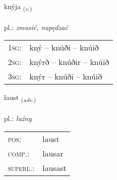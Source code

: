\documentclass[frontgrid, backgrid]{flacards}\usepackage[]{graphicx}\usepackage[]{xcolor}
\begin{document}
\renewcommand{\flhead}{\vskip5pt \fboxsep=0pt {\small\bfseries\footnotesize Sagnorð | czasownik}}
\renewcommand{\fcfoot}{\vskip5pt \fboxsep=0pt \hspace{2pt}{\small\bfseries\footnotesize 3K}}

\renewcommand{\blhead}{\vskip5pt {\small\bfseries\footnotesize Sagnorð | czasownik }}
\renewcommand{\bcfoot}{\vskip5pt \hspace{2pt}{\small\bfseries\footnotesize 3K}}


{knýja \small{\textsubscript{(\textit{v.})}} \\[1ex] %
\textphonetic{[kʰniːja]} \\
pl.: \emph{zmusić, napędzać} \\  [2ex]
\renewcommand*{\arraystretch}{0.8}
\begin{tabular}{p{1cm}l}
\textsc{1sg}: & kný -- knúði -- knúið \\ 
\textsc{2sg}: & knýrð -- knúðir -- knúið \\ 
\textsc{3sg}: & knýr -- knúði -- knúið \\ 
\end{tabular}
}

\renewcommand{\flhead}{\vskip5pt \fboxsep=0pt {\small\bfseries\footnotesize Atviksorð | przysłówek}}
\renewcommand{\fcfoot}{\vskip5pt \fboxsep=0pt \hspace{2pt}{\small\bfseries\footnotesize 3K}}

\renewcommand{\blhead}{\vskip5pt {\small\bfseries\footnotesize Atviksorð | przysłówek }}
\renewcommand{\bcfoot}{\vskip5pt \hspace{2pt}{\small\bfseries\footnotesize 3K}}


{laust \small{\textsubscript{(\textit{adv.})}} \\[1ex] %
\textphonetic{[lœist]} \\
pl.: \emph{luźny} \\  [2ex]
\renewcommand*{\arraystretch}{0.8}
\begin{tabular}{ll}
\textsc{pos}: & laust \\ 
\textsc{comp.}: & lausar \\ 
\textsc{superl.}: & lausast \\
\end{tabular}
}
\end{document}
